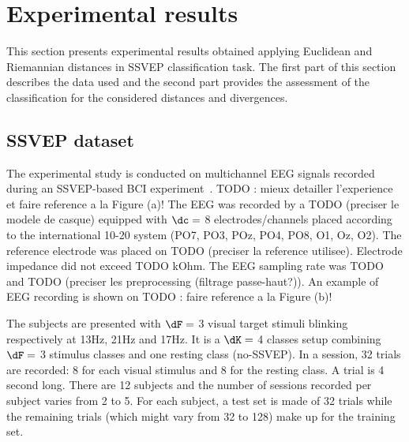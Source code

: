 \section{Experimental results}
\label{sec:expresults}
This section presents experimental results obtained applying Euclidean and Riemannian distances in SSVEP classification task. 
The first part of this section describes the data used and the second part provides the assessment of the classification for the considered distances and divergences. %

\subsection{SSVEP dataset}
The experimental study is conducted on multichannel EEG signals recorded during an SSVEP-based BCI experiment~\cite{kalunga_hybrid_2014}. TODO : mieux detailler l'experience et faire reference a la Figure (a)!
The EEG was recorded by a TODO (preciser le modele de casque) equipped with $\dc=$ 8 electrodes/channels placed according to the international 10-20 system (PO7, PO3, POz, PO4, PO8, O1, Oz, O2). The reference electrode was placed on TODO (preciser la reference utilisee). Electrode impedance did not exceed TODO kOhm. The EEG sampling rate was TODO and TODO (preciser les preprocessing (filtrage passe-haut?)). An example of EEG recording is shown on TODO : faire reference a la Figure (b)!

The subjects are presented with $\dF=$ 3 visual target stimuli blinking respectively at 13Hz, 21Hz and 17Hz.
It is a $\dK=$ 4 classes setup combining $\dF=$ 3 stimulus classes and one resting class (no-SSVEP).
In a session, 32 trials are recorded: 8 for each visual stimulus and 8 for the resting class. 
A trial is 4 second long. 
There are 12 subjects and the number of sessions recorded per subject varies from 2 to 5.
For each subject, a test set is made of 32 trials while the remaining trials (which might vary from 32 to 128) make up for the training set.
